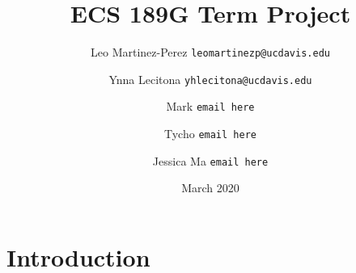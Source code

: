 \documentclass{article}
\title{ECS 189G Term Project}
\author{Leo Martinez-Perez
    \texttt{leomartinezp@ucdavis.edu}
    \and Ynna Lecitona
    \texttt{yhlecitona@ucdavis.edu}
    \and Mark
    \texttt{email here}
    \and Tycho
    \texttt{email here}
    \and Jessica Ma
    \texttt{email here}
}
\date{March 2020}
\begin{document}
\maketitle

\section{Introduction}
\end{document}
